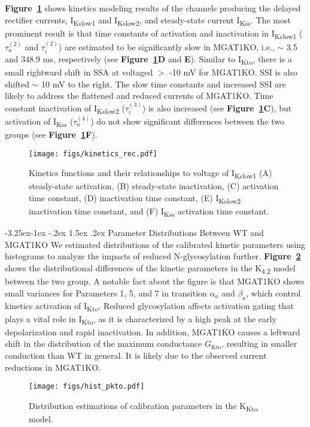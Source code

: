 \documentclass[11pt]{article}
\makeatletter
\renewcommand\subsection{\@startsection{subsection}{2}{\z@}%
                                     {-3.25ex\@plus -1ex \@minus -.2ex}%
                                     {1.5ex \@plus .2ex}%
                                     {\normalfont\fontfamily{phv}\fontsize{14}{17}\bfseries}}
\makeatother
\begin{document}
\textbf{Figure~\ref{fig:kinetics_rec}} shows kinetics modeling results of the channels producing the delayed rectifier currents, I\textsubscript{Kslow1} and I\textsubscript{Kslow2}, and steady-state current I\textsubscript{Kss}. The most prominent result is that time constants of activation and inactivation in I\textsubscript{Kslow1} ($\tau_{a}^{(2)}$ and $\tau_{i}^{(2)}$) are estimated to be significantly slow in MGAT1KO, i.e., $\sim$ 3.5 and 348.9 ms, respectively (see \textbf{Figure~\ref{fig:kinetics_rec}D} and \textbf{E}). Similar to I\textsubscript{Kto}, there is a small rightward shift in SSA at voltaged $>$ -10 mV for MGAT1KO. SSI is also shifted $\sim$ 10 mV to the right. The slow time constants and increased SSI are likely to address the flattened and reduced currents of MGAT1KO. Time constant inactivation of I\textsubscript{Kslow2} ($\tau_{i}^{(3)}$) is also increased (see \textbf{Figure~\ref{fig:kinetics_rec}C}), but activation of I\textsubscript{Kss} ($\tau_{a}^{(4)}$) do not show significant differences between the two groups (see \textbf{Figure~\ref{fig:kinetics_rec}F}).
\begin{figure}[!ht]
    \centering
    \texttt{[image: figs/kinetics\_rec.pdf]}
    \caption{Kinetics functions and their relationships to voltage of I\textsubscript{Kslow1} (A) steady-state activation, (B) steady-state inactivation, (C) activation time constant, (D) inactivation time constant, (E) I\textsubscript{Kslow2} inactivation time constant, and (F) I\textsubscript{Kss} activation time constant.}
    \label{fig:kinetics_rec}
\end{figure}

\subsection{Parameter Distributions Between WT and MGAT1KO} \label{s:results.distribution}
We estimated distributions of the calibrated kinetic parameters using histograms to analyze the impacts of reduced N-glycosylation further. \textbf{Figure~\ref{fig:hist_pkto}} shows the distributional differences of the kinetic parameters in the K\textsubscript{4.2} model between the two group. A notable fact about the figure is that MGAT1KO shows small variances for Parameters 1, 5, and 7 in transition $\alpha_{a}$ and $\beta_{a}$, which control kinetics activation of I\textsubscript{Kto}. Reduced glycosylation affects activation gating that plays a vital role in I\textsubscript{Kto}, as it is characterized by a high peak at the early depolarization and rapid inactivation. In addition, MGAT1KO causes a leftward shift in the distribution of the maximum conductance $G_{\mathrm{Kto}}$, resulting in smaller conduction than WT in general. It is likely due to the observed current reductions in MGAT1KO.
\begin{figure}[!ht]
    \centering
    \texttt{[image: figs/hist\_pkto.pdf]}
    \caption{Distribution estimations of calibration parameters in the K\textsubscript{Kto} model.}
    \label{fig:hist_pkto}
\end{figure}
\end{document}
